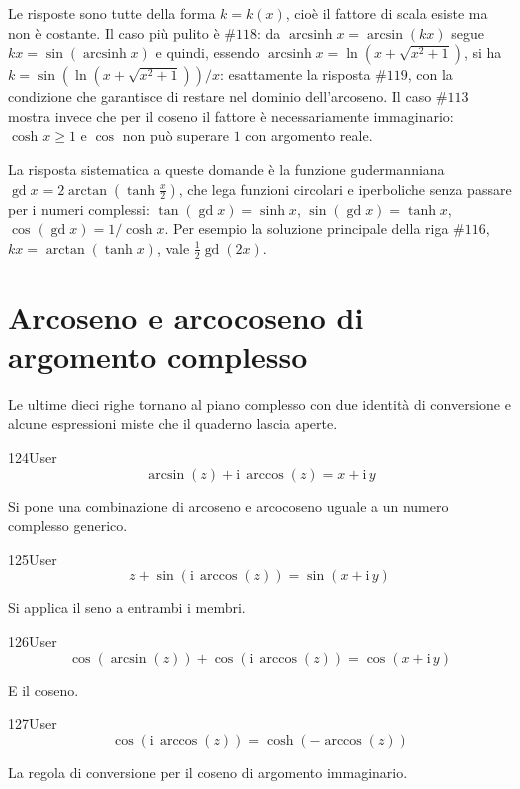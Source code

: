 Le risposte sono tutte della forma $k=k(x)$, cioè il fattore di scala esiste ma non è costante. Il caso più pulito è $\#118$: da $\operatorname{arcsinh}x=\arcsin(kx)$ segue $kx=\sin\!\left(\operatorname{arcsinh}x\right)$ e quindi, essendo $\operatorname{arcsinh}x=\ln\!\left(x+\sqrt{x^2+1}\right)$, si ha $k=\sin\!\left(\ln\!\left(x+\sqrt{x^2+1}\right)\right)/x$: esattamente la risposta $\#119$, con la condizione che garantisce di restare nel dominio dell'arcoseno. Il caso $\#113$ mostra invece che per il coseno il fattore è necessariamente immaginario: $\cosh x\geq1$ e $\cos$ non può superare $1$ con argomento reale.

La risposta sistematica a queste domande è la funzione gudermanniana $\operatorname{gd}x=2\arctan\left(\tanh\tfrac x2\right)$, che lega funzioni circolari e iperboliche senza passare per i numeri complessi: $\tan(\operatorname{gd}x)=\sinh x$, $\sin(\operatorname{gd}x)=\tanh x$, $\cos(\operatorname{gd}x)=1/\cosh x$. Per esempio la soluzione principale della riga $\#116$, $kx=\arctan(\tanh x)$, vale $\tfrac12\operatorname{gd}(2x)$.

\section{Arcoseno e arcocoseno di argomento complesso}

Le ultime dieci righe tornano al piano complesso con due identità di conversione e alcune espressioni miste che il quaderno lascia aperte.

\begin{espr}{124}{User}{}
\[
\arcsin\!\left(z\right) + \mathrm{i}\, \arccos\!\left(z\right) = x + \mathrm{i}\, y
\]
\end{espr}
Si pone una combinazione di arcoseno e arcocoseno uguale a un numero complesso generico.

\begin{espr}{125}{User}{}
\[
z + \sin\!\left(\mathrm{i}\, \arccos\!\left(z\right)\right) = \sin\!\left(x + \mathrm{i}\, y\right)
\]
\end{espr}
Si applica il seno a entrambi i membri.

\begin{espr}{126}{User}{}
\[
\cos\!\left(\arcsin\!\left(z\right)\right) + \cos\!\left(\mathrm{i}\, \arccos\!\left(z\right)\right) = \cos\!\left(x + \mathrm{i}\, y\right)
\]
\end{espr}
E il coseno.

\begin{espr}{127}{User}{\verificata}
\[
\cos\!\left(\mathrm{i}\, \arccos\!\left(z\right)\right) = \cosh\!\left(-\arccos\!\left(z\right)\right)
\]
\end{espr}
La regola di conversione per il coseno di argomento immaginario.

